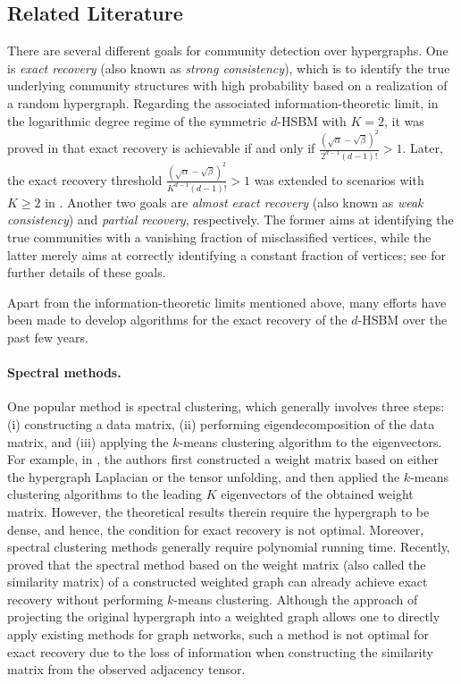 \documentclass{article}
\theoremstyle{plain}
\theoremstyle{definition}
\theoremstyle{remark}
\begin{document}
\subsection{Related Literature}

There are several different goals for community detection over hypergraphs. One is \emph{exact recovery} (also known as \emph{strong consistency}), which is to identify the true underlying community structures with high probability based on a realization of a random hypergraph. Regarding the associated information-theoretic limit, in the logarithmic degree regime of the symmetric $d$-HSBM with $K=2$, it was proved in \citet[Theorem 1]{kim2018stochastic} that exact recovery is achievable if and only if $\frac{(\sqrt{\alpha} - \sqrt{\beta})^2}{2^{d-1}(d-1)!} >1$. Later, the exact recovery threshold $\frac{(\sqrt{\alpha} - \sqrt{\beta})^2}{K^{d-1}(d-1)!} >1$ was extended to scenarios with $K \geq 2$ in \citet[Theorem 2]{zhang2022exact}. Another two goals are \emph{almost exact recovery} (also known as \emph{weak consistency}) and \emph{partial recovery}, respectively. The former aims at identifying the true communities with a vanishing fraction of misclassified vertices, while the latter merely aims at correctly identifying a constant fraction of vertices; see \citet{abbe2017community} for further details of these goals.

Apart from the information-theoretic limits mentioned above, many efforts have been made to develop algorithms for the exact recovery of the $d$-HSBM over the past few years.
\vspace{-0.3cm}
\paragraph{Spectral methods.}
One popular method is spectral clustering, which generally involves three steps: (i) constructing a data matrix, (ii) performing eigendecomposition of the data matrix, and (iii) applying the $k$-means clustering algorithm to the eigenvectors. For example, in \citet{ghoshdastidar2014consistency,ghoshdastidar2015provable,ghoshdastidar2017consistency}, the authors first constructed a weight matrix based on either the hypergraph Laplacian or the tensor unfolding, and then applied the $k$-means clustering algorithms to the leading $K$ eigenvectors of the obtained weight matrix. However, the theoretical results therein require the hypergraph to be dense, and hence, the condition for exact recovery is not optimal. Moreover, spectral clustering methods generally require polynomial running time.
Recently, \citet{gaudio2022community} proved that the spectral method based on the weight matrix (also called the similarity matrix) of a constructed weighted graph can already achieve exact recovery without performing $k$-means clustering. Although the approach of projecting the original hypergraph into a weighted graph allows one to directly apply existing methods for graph networks, such a method is not optimal for exact recovery due to the loss of information \citep{ke2019community} when constructing the similarity matrix from the observed adjacency tensor. 
\vspace{-0.3cm}
\end{document}
